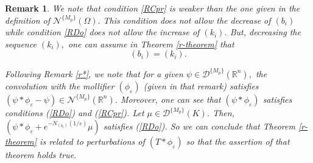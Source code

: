 \documentclass[sn-mathphys,Numbered]{sn-jnl}%
\theoremstyle{thmstyleone}%
\theoremstyle{thmstyletwo}%
\newtheorem{remark}{Remark}%
\theoremstyle{thmstylethree}%
\begin{document}
\begin{remark}\label{comp}
We note that condition \eqref{RCpr} is  weaker than the one given in the definition of $\mathcal N^{\{M_p\}}(\Omega).$ This condition does not allow the decrease of $(b_i)$ while  condition \eqref{RDo} does not allow the increase of $(k_i)$. But,  decreasing the sequence $(k_i),$ one can assume in Theorem \ref{r-theorem} that
\begin{equation*}
    (b_i)=(k_i).
\end{equation*}

Following Remark \ref{r*}, we note  that for a given $\psi\in\mathcal D^{\{M_p\}}(\mathbb R^n),$ the convolution with the mollifier  
$(\phi_\varepsilon)$ (given in that remark) satisfies $(\psi*\phi_\varepsilon-\psi)\in\mathcal N^{\{M_p\}}(\mathbb R^n)$. Moreover, one can   see that
$(\psi*\phi_\varepsilon)$  satisfies conditions (\ref{RDo}) and (\ref{RCpr}). Let $\mu\in\mathcal D^{\{M_p\}}(K)$. Then,
$(\psi*\phi_\varepsilon+e^{-N_{(b_i)}(1/\varepsilon)}\mu)$ satisfies (\ref{RDo}).
So we can conclude that Theorem \ref{r-theorem} is related to  perturbations of $(T*\phi_\varepsilon)$ so that the assertion of that theorem holds true. 
\end{remark}
\end{document}
